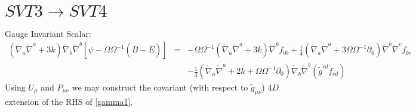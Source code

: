 \documentclass[10pt,letterpaper]{article}
\numberwithin{equation}{section}
\begin{document}
\section{$SVT3\to SVT4$}
Gauge Invariant Scalar:
\begin{eqnarray}
(\tilde\nabla_a\tilde\nabla^a + 3k)\tilde\nabla_b\tilde\nabla^b[ \psi-\dot \Omega \Omega^{-1}(B-\dot E)] &=& 
-\dot\Omega \Omega^{-1}(\tilde\nabla_a\tilde\nabla^a + 3k)\tilde\nabla^b f_{0b}
+\tfrac14 (\tilde\nabla_a\tilde\nabla^a+3\dot\Omega \Omega^{-1}\partial_0)\tilde\nabla^b\tilde\nabla^c f_{bc}
\nonumber\\
&& -\tfrac14 (\tilde\nabla_a\tilde\nabla^a +2k + \dot\Omega \Omega^{-1} \partial_0)\tilde\nabla_b\tilde\nabla^b (\tilde g^{cd}f_{cd})
\label{gamma1}
\end{eqnarray}
Using $U_\mu$ and $P_{\mu\nu}$ we may construct the covariant (with respect to $\tilde g_{\mu\nu}$) $4D$ extension of the RHS of \eqref{gamma1}.
\end{document}
